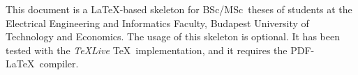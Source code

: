 This document is a \LaTeX-based skeleton for BSc/MSc~theses of students at the Electrical Engineering and Informatics Faculty, Budapest University of Technology and Economics. The usage of this skeleton is optional. It has been tested with the \emph{TeXLive} \TeX~implementation, and it requires the PDF-\LaTeX~compiler.


\vfill
\cleardoublepage

\selectthesislanguage

\setcounter{romanPage}{\value{page}}
